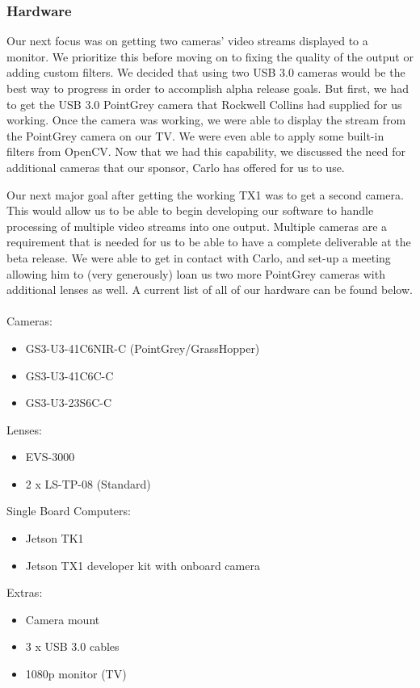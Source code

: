 \documentclass[letterpaper,10pt,titlepage]{IEEEtran}
\begin{document}
   \subsubsection{Hardware}
   Our next focus was on getting two cameras' video streams displayed to a monitor. We prioritize this before moving on to fixing the quality of the output or adding custom filters. We decided that using two USB 3.0 cameras would be the best way to progress in order to accomplish alpha release goals. But first, we had to get the USB 3.0 PointGrey camera that Rockwell Collins had supplied for us working. Once the camera was working, we were able to display the stream from the PointGrey camera on our TV. We were even able to apply some built-in filters from OpenCV. Now that we had this capability, we discussed the need for additional cameras that our sponsor, Carlo has offered for us to use.\\
   \par
Our next major goal after getting the working TX1 was to get a second camera. This would allow us to be able to begin developing our software to handle processing of multiple video streams into one output. Multiple cameras are a requirement that is needed for us to be able to have a complete deliverable at the beta release. We were able to get in contact with Carlo, and set-up a meeting allowing him to (very generously) loan us two more PointGrey cameras with additional lenses as well. A current list of all of our hardware can be found below. \\
  	\\Cameras:  
    		\begin{itemize}
		\item GS3-U3-41C6NIR-C (PointGrey/GrassHopper)
		\item GS3-U3-41C6C-C
		\item GS3-U3-23S6C-C\\

		\end{itemize}

	Lenses: 
		\begin{itemize}
		\item EVS-3000 
		\item 2 x LS-TP-08 (Standard)\\
		\end{itemize}
	Single Board Computers: 
		\begin{itemize}
		\item Jetson TK1
		\item Jetson TX1 developer kit with onboard camera\\
		\end{itemize}
	Extras: 
		\begin{itemize}
		\item Camera mount
		\item 3 x USB 3.0 cables
		\item 1080p monitor (TV)\\
		\end{itemize}
\end{document}

